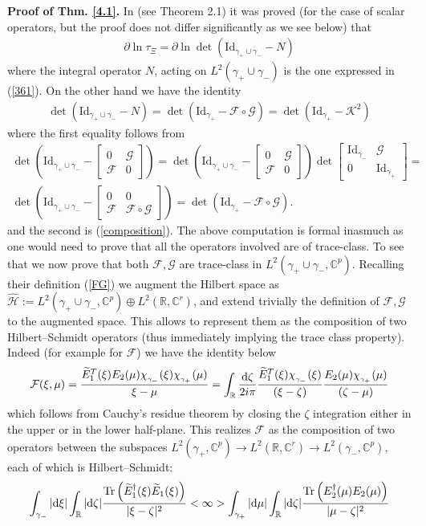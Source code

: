 \documentclass{article}
\def \C{{\mathbf C}}
\def \K{{\mathcal K}}
\def\C{{\mathbb C}}
\def\R{{\mathbb R}}
\def\d{{\rm d}}
\def\wh{\widehat}
\def\wt{\widetilde}
\def \pa{\partial}
\def\Id{\mathrm{Id}}
\def\Tr{\mathop{{\rm Tr}}}
\newcommand{\be}{\begin{eqnarray}}
\newcommand{\ee}{\end{eqnarray}}
\def\le{\left}
\def\ri{\right}
\begin{document}
{\bf Proof of Thm. \ref{4.1}.}
In \cite{BertolaCafasso1} (see Theorem 2.1) it was proved (for the case of scalar operators, but the proof does not differ significantly as we see below) that 
\be\label{previousarticle}
	\pa\ln\tau_{\Xi}=\pa\ln\det(\Id_{\gamma_+\cup\gamma_-}-N)
\ee 
where the integral operator $N$, acting on $L^2(\gamma_+\cup\gamma_-)$
is the one expressed in (\ref{361}). 
On the other hand we have the identity 
\be
\det (\Id_{\gamma_+\cup\gamma_-}-N) = \det (\Id_{\gamma_+}-\mathcal F\circ \mathcal G ) =\det (\Id_{\gamma_+}-\K^2 )
\ee
where the first equality follows from 
\be
\det\le(\Id_{\gamma_+\cup\gamma_-} - \le[
\begin{array}{cc}
0& \mathcal G\\
\mathcal F & 0
\end{array}
\ri]\ri) = \det\le(\Id_{\gamma_+\cup\gamma_-} - \le[
\begin{array}{cc}
0& \mathcal G\\
\mathcal F & 0
\end{array}
\ri]\ri) \det  \le[
\begin{array}{cc}
\Id_{\gamma_-} & \mathcal G\\
0 & \Id_{\gamma_+}
\end{array}
\ri]=\\
 \det\le(\Id_{\gamma_+\cup\gamma_-} - \le[
\begin{array}{cc}
0&0\\
\mathcal F & \mathcal F\circ \mathcal G
\end{array}
\ri]\ri)  = \det \le(\Id_{\gamma_+} - \mathcal F\circ \mathcal G\ri).
\ee
and the second is (\ref{composition}). 
The above computation is formal inasmuch as one would need to prove that all the operators involved are of trace-class. To see that we now prove that both $\mathcal F, \mathcal G$ are trace-class in $L^2(\gamma_+\cup\gamma_-,\C^p)$. Recalling their definition (\ref{FG}) we augment the Hilbert space as $\wh {\mathcal H}:= L^2(\gamma_+\cup\gamma_-,\C^p) \oplus L^2(\R, \C^r)$, and extend trivially  the definition of  $\mathcal F, \mathcal G$ to the augmented space. This allows to represent them as the composition of two Hilbert--Schmidt operators (thus immediately implying the trace class property). Indeed (for example for $\mathcal F$) we have the identity below
\be
\mathcal F(\xi, \mu)=
	\frac{\wt E_1^T (\xi) E_2(\mu) \chi_{_{\gamma_-}}(\xi)\chi_{_{\gamma_+}}(\mu)}{\xi-\mu} = 
\int_\R \frac{\d \zeta}{2i\pi} \frac{\wt E_1^T (\xi)\chi_{_{\gamma_-}}(\xi)}{(\xi-\zeta)} \frac {E_2(\mu) \chi_{_{\gamma_+}}(\mu)}{(\zeta-\mu)} 
\ee
which follows from Cauchy's residue theorem by closing the $\zeta$ integration either in the upper or in the lower half-plane. This realizes $\mathcal F$ as the composition of two operators between the subspaces $L^2(\gamma_+,\C^p)\to L^2(\R, \C^r) \to L^2(\gamma_-, \C^p)$, each of which is Hilbert--Schmidt:
\be
\int_{\gamma_-}|\d\xi| \int_\R |\d\zeta| \frac {\Tr \le(\wt E_1^\dagger(\xi)\wt E_1(\xi)\ri)}{|\xi-\zeta|^2} <\infty>  \int_{\gamma_+}|\d\mu| \int_\R |\d\zeta| \frac {\Tr \le(E_2^\dagger(\mu)E_2(\mu)\ri)}{|\mu-\zeta|^2} 
\ee
\end{document}
